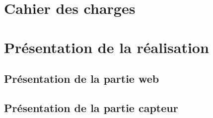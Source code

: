 \section{Cahier des charges}


\section{Présentation de la réalisation}
	\subsection{Présentation de la partie web}
	
	\subsection{Présentation de la partie capteur}
